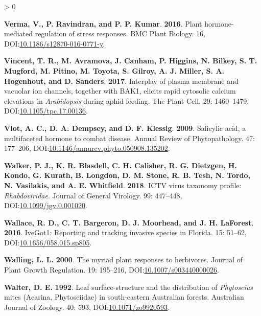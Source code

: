 \documentclass{ufdissertation}[overrideChapters] %
\newlength{\cslhangindent}
\newenvironment{CSLReferences}[2] %
 {%
  \setlength{\parindent}{0pt}
  \ifodd #1 \everypar{\setlength{\hangindent}{\cslhangindent}}\ignorespaces\fi
  \ifnum #2 > 0
  \setlength{\parskip}{#2\baselineskip}
  \fi
 }%
 {}
\begin{document}
{\begin{CSLReferences}{1}{1}
\leavevmode{}%
\textbf{Verma, V., P. Ravindran, and P. P. Kumar}. \textbf{2016}. Plant hormone-mediated regulation of stress responses. {BMC} Plant Biology. 16, DOI:\href{https://doi.org/10.1186/s12870-016-0771-y}{10.1186/s12870-016-0771-y}.

\leavevmode{}%
\textbf{Vincent, T. R., M. Avramova, J. Canham, P. Higgins, N. Bilkey, S. T. Mugford, M. Pitino, M. Toyota, S. Gilroy, A. J. Miller, S. A. Hogenhout, and D. Sanders}. \textbf{2017}. Interplay of plasma membrane and vacuolar ion channels, together with {BAK}1, elicits rapid cytosolic calcium elevations in {\emph{Arabidopsis}} during aphid feeding. The Plant Cell. 29: 1460--1479, DOI:\href{https://doi.org/10.1105/tpc.17.00136}{10.1105/tpc.17.00136}.

\leavevmode{}%
\textbf{Vlot, A. C., D. A. Dempsey, and D. F. Klessig}. \textbf{2009}. Salicylic acid, a multifaceted hormone to combat disease. Annual Review of Phytopathology. 47: 177--206, DOI:\href{https://doi.org/10.1146/annurev.phyto.050908.135202}{10.1146/annurev.phyto.050908.135202}.

\leavevmode{}%
\textbf{Walker, P. J., K. R. Blasdell, C. H. Calisher, R. G. Dietzgen, H. Kondo, G. Kurath, B. Longdon, D. M. Stone, R. B. Tesh, N. Tordo, N. Vasilakis, and A. E. Whitfield}. \textbf{2018}. {ICTV} virus taxonomy profile: {\emph{Rhabdoviridae}}. Journal of General Virology. 99: 447--448, DOI:\href{https://doi.org/10.1099/jgv.0.001020}{10.1099/jgv.0.001020}.

\leavevmode{}%
\textbf{Wallace, R. D., C. T. Bargeron, D. J. Moorhead, and J. H. LaForest}. \textbf{2016}. {IveGot}1: Reporting and tracking invasive species in {Florida}. 15: 51--62, DOI:\href{https://doi.org/10.1656/058.015.sp805}{10.1656/058.015.sp805}.

\leavevmode{}%
\textbf{Walling, L. L.} \textbf{2000}. The myriad plant responses to herbivores. Journal of Plant Growth Regulation. 19: 195--216, DOI:\href{https://doi.org/10.1007/s003440000026}{10.1007/s003440000026}.

\leavevmode{}%
\textbf{Walter, D. E.} \textbf{1992}. Leaf surface-structure and the distribution of {\emph{Phytoseius}} mites ({Acarina}, {Phytoseiidae}) in south-eastern {Australian} forests. Australian Journal of Zoology. 40: 593, DOI:\href{https://doi.org/10.1071/zo9920593}{10.1071/zo9920593}.


\end{CSLReferences}}
\end{document}
